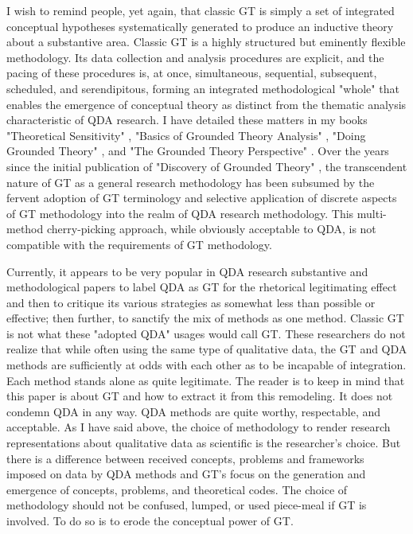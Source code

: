 I wish to remind people, yet again, that classic GT is simply a set of integrated conceptual hypotheses systematically generated to produce an inductive theory about a substantive area. 
Classic GT is a highly structured but eminently flexible methodology. 
Its data collection and analysis procedures are explicit, and the pacing of these procedures is, at once, simultaneous, sequential, subsequent, scheduled, and serendipitous, forming an integrated methodological "whole" that enables the emergence of conceptual theory as distinct from the thematic analysis characteristic of QDA research. 
I have detailed these matters in my books "Theoretical Sensitivity" 
\citep{book.glaser98a},
"Basics of Grounded Theory Analysis" 
\citep{book.glaser92},
"Doing Grounded Theory" 
\citep{book.glaser98b},
and "The Grounded Theory Perspective" 
\citep{book.glaser01}.
Over the years since the initial publication of "Discovery of Grounded Theory" 
\citep{book.glaser67},
the transcendent nature of GT as a general research methodology has been subsumed by the fervent adoption of GT terminology and selective application of discrete aspects of GT methodology into the realm of QDA research methodology. 
This multi-method cherry-picking approach, while obviously
acceptable to QDA, is not compatible with the requirements of GT methodology.

Currently, it appears to be very popular in QDA research substantive and
methodological papers to label QDA as GT for the rhetorical legitimating effect and then to critique its various strategies as somewhat less than possible or effective; then further, to sanctify the mix of methods as one method. 
Classic GT is not what these "adopted QDA" usages would call GT. 
These researchers do not realize that while often using the same type of qualitative data, the GT and QDA methods are sufficiently at odds with each other as to be incapable of integration. 
Each method stands alone as quite legitimate. 
The reader is to keep in mind that this paper is about GT and how to extract it from this remodeling. 
It does not condemn QDA in any way. QDA methods are quite worthy, respectable, and acceptable. 
As I have said above, the choice of methodology to render research representations about qualitative data as scientific is the researcher’s choice. 
But there is a difference between received concepts, problems and
frameworks imposed on data by QDA methods and GT’s focus on the
generation and emergence of concepts, problems, and theoretical codes. 
The choice of methodology should not be confused, lumped, or used piece-meal if GT is involved. 
To do so is to erode the conceptual power of GT.

